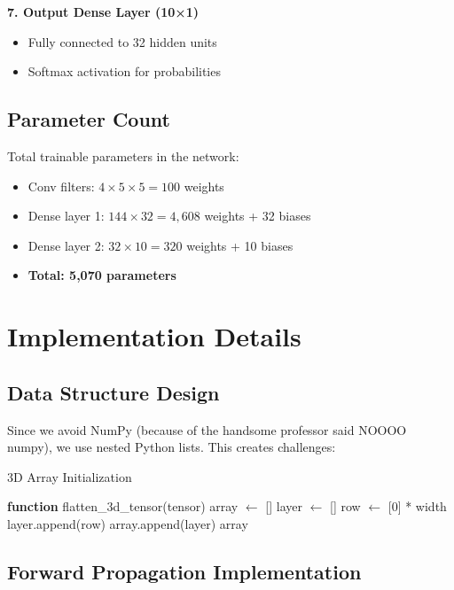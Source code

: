 \documentclass[conference]{IEEEtran}
\begin{document}
\textbf{7. Output Dense Layer (10×1)}
\begin{itemize}
    \item Fully connected to 32 hidden units
    \item Softmax activation for probabilities
\end{itemize}

\subsection{Parameter Count}
Total trainable parameters in the network:
\begin{itemize}
    \item Conv filters: $4 \times 5 \times 5 = 100$ weights
    \item Dense layer 1: $144 \times 32 = 4,608$ weights + 32 biases
    \item Dense layer 2: $32 \times 10 = 320$ weights + 10 biases
    \item \textbf{Total: 5,070 parameters}
\end{itemize}

\section{Implementation Details}

\subsection{Data Structure Design}
Since we avoid NumPy (because of the handsome professor said NOOOO numpy), we use nested Python lists. This creates challenges:

\begin{algorithm}
\caption{3D Array Initialization}
\begin{algorithmic}[1]
\STATE \textbf{function} flatten\_3d\_tensor(tensor)
\STATE array $\leftarrow$ []
    \STATE layer $\leftarrow$ []
        \STATE row $\leftarrow$ [0] * width
        \STATE layer.append(row)
    \ENDFOR
    \STATE array.append(layer)
\ENDFOR
\RETURN array
\end{algorithmic}
\end{algorithm}

\subsection{Forward Propagation Implementation}
\end{document}
